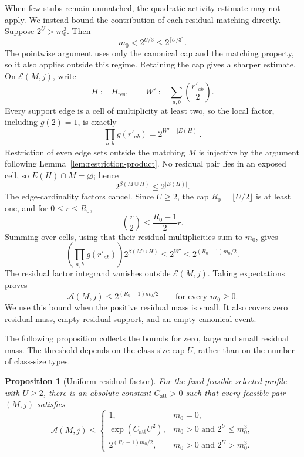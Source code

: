 \documentclass[a4paper,10pt,reqno]{amsart}
\numberwithin{equation}{section}
\theoremstyle{plain}
\newtheorem{proposition}[theorem]{Proposition}
\theoremstyle{remark}
\begin{document}
When few stubs remain unmatched, the quadratic activity estimate may not
apply. We instead bound the contribution of each residual matching
directly.
Suppose $2^U>m_0^3$. Then
\begin{equation}
  m_0<2^{U/3}\le2^{\lceil U/3\rceil}.
  \label{eq:small-residual-mass}
\end{equation}
The pointwise argument uses only the canonical cap and the matching
property, so it also applies outside this regime. Retaining the cap gives
a sharper estimate. On
$\mathcal E(M,j)$, write
\[
  H:=H_{\mathrm{res}},
  \qquad
  W':=\sum_{a,b}\binom{r'_{ab}}2.
\]
Every support edge is a cell of multiplicity at least two, so the local factor, including $g(2)=1$, is exactly
\[
  \prod_{a,b}g(r'_{ab})=2^{W'-|E(H)|}.
\]
Restriction of even edge sets outside the matching $M$ is injective by
the argument following Lemma~\ref{lem:restriction-product}.
No residual pair lies in an exposed cell, so $E(H)\cap M=\varnothing$; hence
\[
  2^{\beta(M\cup H)}\le2^{|E(H)|}.
\]
The edge-cardinality factors cancel. Since $U\ge2$, the cap
$R_0=\lfloor U/2\rfloor$ is at least one, and for $0\le r\le R_0$,
\[
  \binom r2\le\frac{R_0-1}{2}r.
\]
Summing over cells, using that their residual multiplicities sum to
$m_0$, gives
\[
  \left(\prod_{a,b}g(r'_{ab})\right)2^{\beta(M\cup H)}
  \le2^{W'}\le2^{(R_0-1)m_0/2}.
\]
The residual factor integrand vanishes outside $\mathcal E(M,j)$. Taking
expectations proves
\begin{equation}
  \mathcal A(M,j)\le2^{(R_0-1)m_0/2}
  \qquad\text{for every }m_0\ge0.
  \label{eq:complementary-attachment}
\end{equation}
We use this bound when the positive residual mass is small. It also covers
zero residual mass, empty residual support, and an empty canonical event.

The following proposition collects the bounds for zero, large and small
residual mass. The threshold depends on the class-size cap $U$, rather than
on the number of class-size types.

\begin{proposition}[Uniform residual factor]
\label{prop:uniform-residual-attachment}
For the fixed feasible selected profile with $U\ge2$, there is an absolute
constant $C_{\mathrm{att}}>0$ such that every feasible pair $(M,j)$
satisfies
\[
  \mathcal A(M,j)
  \le
  \begin{cases}
    1,&m_0=0,\\
    \exp(C_{\mathrm{att}}U^2),&m_0>0\text{ and }2^U\le m_0^3,\\
    2^{(R_0-1)m_0/2},&m_0>0\text{ and }2^U>m_0^3.
  \end{cases}
\]
\end{proposition}
\end{document}

